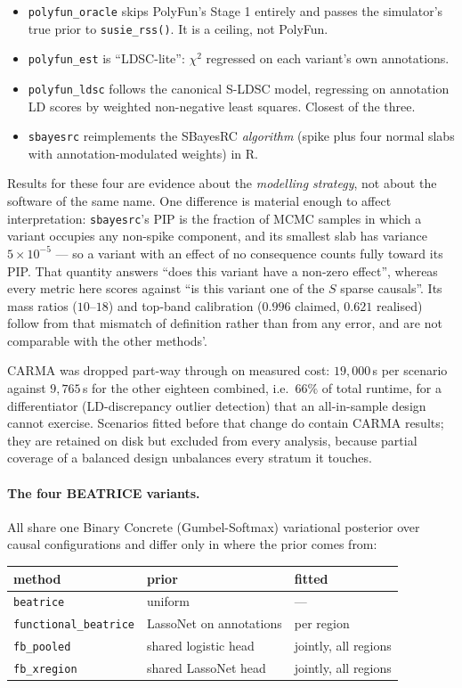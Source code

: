 \documentclass[11pt,a4paper]{article}
\begin{document}
\begin{itemize}
\item \texttt{polyfun\_oracle} skips PolyFun's Stage 1 entirely and passes the
simulator's true prior to \texttt{susie\_rss()}. It is a ceiling, not PolyFun.
\item \texttt{polyfun\_est} is ``LDSC-lite'': $\chi^2$ regressed on each
variant's own annotations.
\item \texttt{polyfun\_ldsc} follows the canonical S-LDSC model, regressing on
annotation LD scores by weighted non-negative least squares. Closest of the three.
\item \texttt{sbayesrc} reimplements the SBayesRC \emph{algorithm} (spike plus
four normal slabs with annotation-modulated weights) in R.
\end{itemize}

Results for these four are evidence about the \emph{modelling strategy}, not
about the software of the same name. One difference is material enough to
affect interpretation: \texttt{sbayesrc}'s PIP is the fraction of MCMC samples
in which a variant occupies any non-spike component, and its smallest slab has
variance $5\times10^{-5}$ --- so a variant with an effect of no consequence
counts fully toward its PIP. That quantity answers ``does this variant have a
non-zero effect'', whereas every metric here scores against ``is this variant
one of the $S$ sparse causals''. Its mass ratios ($10$--$18$) and top-band
calibration ($0.996$ claimed, $0.621$ realised) follow from that mismatch of
definition rather than from any error, and are not comparable with the other
methods'.

CARMA was dropped part-way through on measured cost: $19{,}000$\,s per scenario
against $9{,}765$\,s for the other eighteen combined, i.e.\ $66\%$ of total
runtime, for a differentiator (LD-discrepancy outlier detection) that an
all-in-sample design cannot exercise. Scenarios fitted before that change do
contain CARMA results; they are retained on disk but excluded from every
analysis, because partial coverage of a balanced design unbalances every
stratum it touches.

\paragraph{The four BEATRICE variants.} All share one Binary Concrete
(Gumbel-Softmax) variational posterior over causal configurations and differ
only in where the prior comes from:

\begin{center}\small
\begin{tabular}{lll}\toprule
method & prior & fitted\\\midrule
\texttt{beatrice} & uniform & ---\\
\texttt{functional\_beatrice} & LassoNet on annotations & per region\\
\texttt{fb\_pooled} & shared logistic head & jointly, all regions\\
\texttt{fb\_xregion} & shared LassoNet head & jointly, all regions\\
\bottomrule\end{tabular}\end{center}
\end{document}

